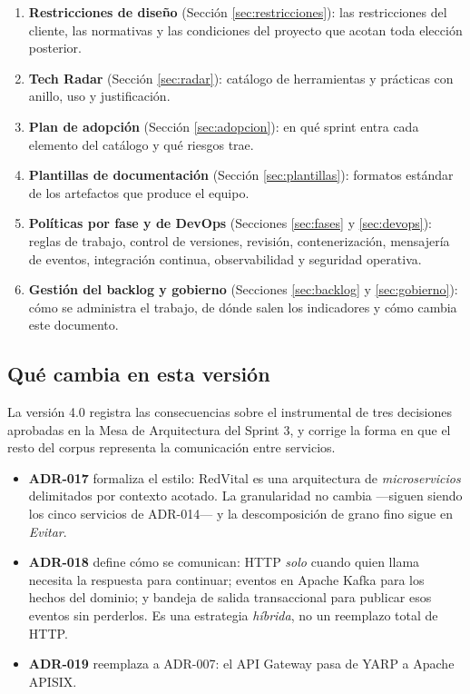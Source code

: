 \documentclass[11pt,a4paper]{article}
\begin{document}
\begin{enumerate}
\item \textbf{Restricciones de diseño} (Sección \ref{sec:restricciones}): las restricciones del cliente, las normativas y las condiciones del proyecto que acotan toda elección posterior.
\item \textbf{Tech Radar} (Sección \ref{sec:radar}): catálogo de herramientas y prácticas con anillo, uso y justificación.
\item \textbf{Plan de adopción} (Sección \ref{sec:adopcion}): en qué sprint entra cada elemento del catálogo y qué riesgos trae.
\item \textbf{Plantillas de documentación} (Sección \ref{sec:plantillas}): formatos estándar de los artefactos que produce el equipo.
\item \textbf{Políticas por fase y de DevOps} (Secciones \ref{sec:fases} y \ref{sec:devops}): reglas de trabajo, control de versiones, revisión, contenerización, mensajería de eventos, integración continua, observabilidad y seguridad operativa.
\item \textbf{Gestión del backlog y gobierno} (Secciones \ref{sec:backlog} y \ref{sec:gobierno}): cómo se administra el trabajo, de dónde salen los indicadores y cómo cambia este documento.
\end{enumerate}

\subsection{Qué cambia en esta versión}

La versión 4.0 registra las consecuencias sobre el instrumental de tres decisiones aprobadas en la Mesa de Arquitectura del Sprint 3, y corrige la forma en que el resto del corpus representa la comunicación entre servicios.

\begin{itemize}
\item \textbf{ADR-017} formaliza el estilo: RedVital es una arquitectura de \emph{microservicios} delimitados por contexto acotado. La granularidad no cambia ---siguen siendo los cinco servicios de ADR-014--- y la descomposición de grano fino sigue en \emph{Evitar}.
\item \textbf{ADR-018} define cómo se comunican: HTTP \emph{solo} cuando quien llama necesita la respuesta para continuar; eventos en Apache Kafka para los hechos del dominio; y bandeja de salida transaccional para publicar esos eventos sin perderlos. Es una estrategia \emph{híbrida}, no un reemplazo total de HTTP.
\item \textbf{ADR-019} reemplaza a ADR-007: el API Gateway pasa de YARP a Apache APISIX.
\end{itemize}
\end{document}
